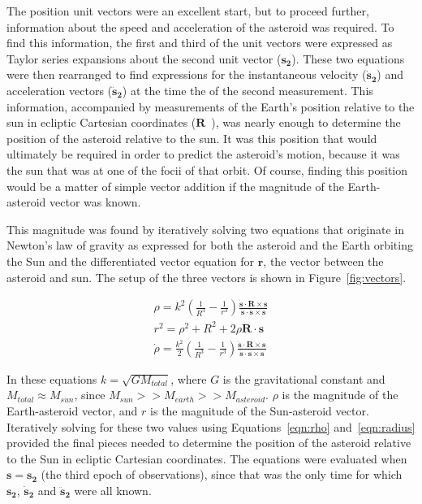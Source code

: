 \documentclass[a4paper,12pt]{article}
\begin{document}
The position unit vectors were an excellent start, but to proceed further, information about the speed and acceleration of the asteroid was required. To find this information, the first and third of the unit vectors were expressed as Taylor series expansions about the second unit vector ($\mathbf{s_2}$). These two equations were then rearranged to find expressions for the instantaneous velocity ($\mathbf{\dot{s}_2}$) and acceleration vectors ($\mathbf{\ddot{s}_2}$) at the time the of the second measurement. This information, accompanied by measurements of the Earth's position relative to the sun in ecliptic Cartesian coordinates ($\mathbf{R}$~\citep{urania}), was nearly enough to determine the position of the asteroid relative to the sun. It was this position that would ultimately be required in order to predict the asteroid's motion, because it was the sun that was at one of the focii of that orbit. Of course, finding this position would be a matter of simple vector addition if the magnitude of the Earth-asteroid vector was known.

This magnitude was found by iteratively solving two equations that originate in Newton's law of gravity as expressed for both the asteroid and the Earth orbiting the Sun and the differentiated vector equation for $\mathbf{r}$, the vector between the asteroid and sun. The setup of the three vectors is shown in Figure~\ref{fig:vectors}.

\begin{eqnarray}
\label{eqn:rho}
\rho = k^2\left(\frac{1}{R^3}-\frac{1}{r^3}\right)\frac{\mathbf{\dot{s}}\cdot\mathbf{R}\times\mathbf{s}}{\mathbf{\dot{s}}\cdot\mathbf{\ddot{s}}\times\mathbf{s}}\\
\label{eqn:radius}
r^2 = \rho^2 + R^2 + 2\rho\mathbf{R}\cdot\mathbf{s}\\
\dot{\rho} = \frac{k^2}{2}\left(\frac{1}{R^3}-\frac{1}{r^3}\right)\frac{\mathbf{\ddot{s}}\cdot\mathbf{R}\times\mathbf{s}}{\mathbf{\ddot{s}}\cdot\mathbf{\dot{s}}\times\mathbf{s}}
\label{eqn:rhodot}
\end{eqnarray}

In these equations $k = \sqrt{GM_{total}}$, where $G$ is the gravitational constant and $M_{total} \approx M_{sun}$, since $M_{sun} >> M_{earth} >> M_{asteroid}$. $\rho$ is the magnitude of the Earth-asteroid vector, and $r$ is the magnitude of the Sun-asteroid vector.  Iteratively solving for these two values using Equations~\ref{eqn:rho} and~\ref{eqn:radius} provided the final pieces needed to determine the position of the asteroid relative to the Sun in ecliptic Cartesian coordinates. The equations were evaluated when $\mathbf{s} = \mathbf{s_2}$ (the third epoch of observations), since that was the only time for which $\mathbf{s_2}$, $\mathbf{\dot{s}_2}$ and $\mathbf{\ddot{s}_2}$ were all known.
\end{document}
